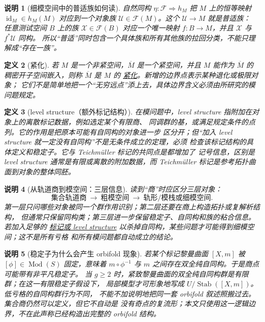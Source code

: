 \documentclass[UTF8,fontset=none,a4paper,11pt]{ctexart}
\theoremstyle{foundation-definition}
\newtheorem{definition}{定义}[section]
\theoremstyle{foundation-theorem}
\theoremstyle{foundation-proposition}
\theoremstyle{foundation-example}
\theoremstyle{foundation-remark}
\newtheorem{remark}[definition]{说明}
\theoremstyle{foundation-theorem}
\newcommand{\Mod}{\operatorname{Mod}}
\newcommand{\term}[2]{\hyperref[#1]{#2}}
\begin{document}
\begin{remark}[细模空间中的普适族如何读]\label{rem:fine-universal-family-reading}
自然同构 \(\eta:\mathcal F\Rightarrow h_M\) 把 \(M\) 上的恒等映射
\(\operatorname{id}_M\in h_M(M)\) 对应到一个对象族
\(\mathcal U\in\mathcal F(M)\)。这个 \(\mathcal U\to M\) 就是普适族：
任意测试空间 \(B\) 上的族 \(\mathcal X\in\mathcal F(B)\) 对应一个唯一映射
\(f:B\to M\)，并且 \(\mathcal X\) 与 \(f^*\mathcal U\) 同构。
所以“普适”同时包含一个具体族和所有其他族的拉回分类，不能只理解成“存在一族”。
\end{remark}

\begin{definition}[紧化]\label{def:compactification}
若 \(M\) 是一个非紧空间，\(\overline M\) 是一个紧空间，并且 \(M\) 能作为
\(\overline M\) 的稠密开子空间嵌入，则称 \(\overline M\) 是 \(M\) 的
\term{def:compactification}{紧化}。新增的边界点表示某种退化或极限对象；
它们不是简单地把一个“无穷远点”添上去，具体边界含义必须由所研究的模问题规定。
\end{definition}

\begin{definition}[level structure（额外标记结构）]\label{def:level-structure}
在模问题中，level structure 指附加在对象上的离散标记数据，例如选定某个有限商、
同调群的基，或满足规定条件的点列。它的作用是把原本可能有自同构的对象进一步
区分开；但“加入 level structure 就一定没有自同构”不是无条件成立的定理，必须
检查该标记结构的具体定义和稳定子。它与 Teichmüller 标记的共同点是都增加了
记号信息，区别是 level structure 通常是有限或离散的附加数据，而 Teichmüller
标记是参考拓扑曲面到对象的整体同胚。
\end{definition}

\begin{remark}[从轨道商到模空间：三层信息]
读到“商”时应区分三层对象：
\[
\text{集合轨道商}
\ \longrightarrow\
\text{粗模空间}
\ \longrightarrow\
\text{轨形/模栈或细模空间}.
\]
第一层只问哪些对象被同一个群作用识别；第二层还要在商上构造拓扑或复解析结构，
但通常只保留同构类；第三层进一步保留稳定子、自同构和族的粘合信息。若加入足够的
\term{def:level-structure}{标记或 level structure} 以杀掉自同构，某些问题才可能得到细模空间；这不是所有亏格
和所有模问题都自动成立的结论。
\end{remark}

\begin{remark}[稳定子为什么会产生 orbifold 现象]
若某个标记黎曼曲面 \([X,m]\) 被 \([\phi]\in\Mod(S)\) 固定，意味着
\(m\circ\phi^{-1}\) 与 \(m\) 之间存在双全纯自同构。于是商点可能带有非平凡稳定子。
当 \(g\geq2\) 时，紧致黎曼曲面的双全纯自同构群是有限群；在这一有限稳定子假设下，
局部模型才可形象地写成 \(U/\operatorname{Stab}([X,m])\)。低亏格的自同构群行为不同，
不能不加说明地把同一套 orbifold 叙述照搬过去。集合商仍然可以定义，但它不自动是
没有奇点的复流形；本文只使用这一逻辑边界，不在此声称已经构造出完整的 orbifold 结构。
\end{remark}
\end{document}
